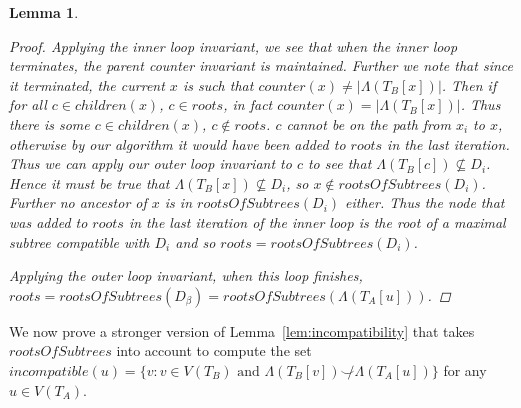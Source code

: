 \documentclass{article}
\newcommand{\compatible}{\smile}
\newcommand{\leafset}{\Lambda}
\newtheorem{computerootsofsubtreescorrectness}[incompatibility]{Lemma}
\begin{document}
\begin{computerootsofsubtreescorrectness}
\begin{proof}
            Applying the inner loop invariant, we see that when the inner loop terminates, the parent counter invariant is maintained. Further we note that since it terminated, the current $x$ is such that $counter(x) \neq |\leafset(T_B[x])|$. Then if for all $c \in children(x)$, $c \in roots$, in fact $counter(x) = |\leafset(T_B[x])|$. Thus there is some $c \in children(x)$, $c \not\in roots$. $c$ cannot be on the path from $x_i$ to $x$, otherwise by our algorithm it would have been added to $roots$ in the last iteration. Thus we can apply our outer loop invariant to $c$ to see that $\leafset(T_B[c]) \not\subseteq D_i$. Hence it must be true that $\leafset(T_B[x]) \not\subseteq D_i$, so $x \not\in rootsOfSubtrees(D_i)$. Further no ancestor of $x$ is in $rootsOfSubtrees(D_i)$ either. Thus the node that was added to $roots$ in the last iteration of the inner loop is the root of a maximal subtree compatible with $D_i$ and so $roots = rootsOfSubtrees(D_i)$.

            Applying the outer loop invariant, when this loop finishes, $roots = rootsOfSubtrees(D_{\beta}) = rootsOfSubtrees(\leafset(T_A[u]))$.
        \end{proof}
    \end{computerootsofsubtreescorrectness}

    We now prove a stronger version of Lemma~\ref{lem:incompatibility} that takes $rootsOfSubtrees$ into account to compute the set $incompatible(u) = \{v : v \in V(T_B) \text{ and } \leafset(T_B[v]) \not\compatible \leafset(T_A[u])\}$ for any $u \in V(T_A)$.
\end{document}
